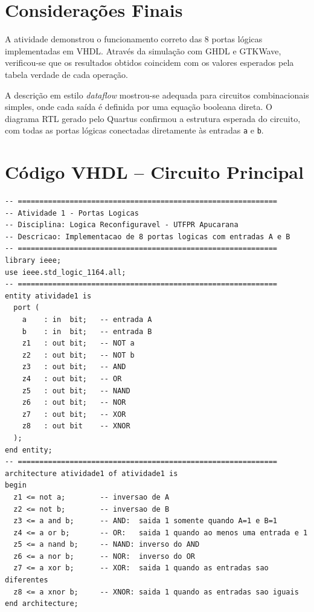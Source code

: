 \documentclass[12pt,a4paper, brazil]{article}
\begin{document}
\section{Considerações Finais}

A atividade demonstrou o funcionamento correto das 8 portas lógicas implementadas em VHDL. Através da simulação com GHDL e GTKWave, verificou-se que os resultados obtidos coincidem com os valores esperados pela tabela verdade de cada operação.

A descrição em estilo \textit{dataflow} mostrou-se adequada para circuitos combinacionais simples, onde cada saída é definida por uma equação booleana direta. O diagrama RTL gerado pelo Quartus confirmou a estrutura esperada do circuito, com todas as portas lógicas conectadas diretamente às entradas \texttt{a} e \texttt{b}.

\appendix

\section{Código VHDL -- Circuito Principal}
\label{ap:codigo-principal}

\begin{lstlisting}[style=vhdl, caption={Arquivo atividade1.vhd -- implementação das 8 portas lógicas.}]
-- ============================================================
-- Atividade 1 - Portas Logicas
-- Disciplina: Logica Reconfiguravel - UTFPR Apucarana
-- Descricao: Implementacao de 8 portas logicas com entradas A e B
-- ============================================================
library ieee;
use ieee.std_logic_1164.all;
-- ============================================================
entity atividade1 is
  port (
    a    : in  bit;   -- entrada A
    b    : in  bit;   -- entrada B
    z1   : out bit;   -- NOT a
    z2   : out bit;   -- NOT b
    z3   : out bit;   -- AND
    z4   : out bit;   -- OR
    z5   : out bit;   -- NAND
    z6   : out bit;   -- NOR
    z7   : out bit;   -- XOR
    z8   : out bit    -- XNOR
  );
end entity;
-- ============================================================
architecture atividade1 of atividade1 is
begin
  z1 <= not a;        -- inversao de A
  z2 <= not b;        -- inversao de B
  z3 <= a and b;      -- AND:  saida 1 somente quando A=1 e B=1
  z4 <= a or b;       -- OR:   saida 1 quando ao menos uma entrada e 1
  z5 <= a nand b;     -- NAND: inverso do AND
  z6 <= a nor b;      -- NOR:  inverso do OR
  z7 <= a xor b;      -- XOR:  saida 1 quando as entradas sao diferentes
  z8 <= a xnor b;     -- XNOR: saida 1 quando as entradas sao iguais
end architecture;
\end{lstlisting}
\end{document}
